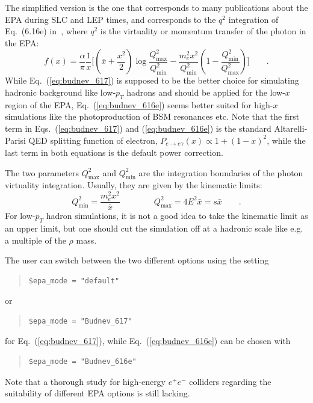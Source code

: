 \documentclass[12pt]{book}
\begin{document}
The simplified version is the one that corresponds to many
publications about the EPA during SLC and LEP times, and corresponds
to the $q^2$ integration of Eq.~(6.16e) in~\cite{Budnev:1974de}, where
$q^2$ is the virtuality or momentum transfer of the photon in the EPA:
\begin{equation}
  \label{eq:budnev_616e}
  f(x) = \frac{\alpha}{\pi} \frac{1}{x} \biggl[ \left( \bar{x} +
    \frac{x^2}{2} \right) \log
    \frac{Q^2_{\text{max}}}{Q^2_{\text{min}}}
    - \frac{m_e^2 x^2}{Q^2_{\text{min}}} \left( 1 -
    \frac{Q^2_{\text{min}}}{Q^2_{\text{max}}} \right) \biggr] \qquad .
\end{equation}
While Eq.~(\ref{eq:budnev_617}) is supposed to be the better choice
for simulating hadronic background like low-$p_T$ hadrons and should
be applied for the low-$x$ region of the EPA,
Eq.~(\ref{eq:budnev_616e}) seems better suited for high-$x$
simulations like the photoproduction of BSM resonances etc.
Note that the first term in Eqs.~(\ref{eq:budnev_617}) and
(\ref{eq:budnev_616e}) is the standard Altarelli-Parisi QED splitting
function of electron, $P_{e\to e\gamma}(x) \propto 1 + (1-x)^2$, while
the last term in both equations is the default power correction.

The two parameters $Q^2_{\text{max}}$ and $Q^2_{\text{min}}$ are the
integration boundaries of the photon virtuality integration. Usually,
they are given by the kinematic limits:
\begin{equation}
  Q^2_{\text{min}} = \frac{m_e^2 x^2}{\bar{x}} \qquad\qquad
  Q^2_{\text{max}} = 4 E^2 \bar{x} = s \bar{x} \qquad .
\end{equation}
For low-$p_T$ hadron simulations, it is not a good idea to take the
kinematic limit as an upper limit, but one should cut the simulation
off at a hadronic scale like e.g. a multiple of the $\rho$ mass.

The user can switch between the two different options using the setting
\begin{quote}
\begin{footnotesize}
\begin{Verbatim}
$epa_mode = "default"
\end{Verbatim}
\end{footnotesize}
\end{quote}
or
\begin{quote}
\begin{footnotesize}
\begin{Verbatim}
$epa_mode = "Budnev_617"
\end{Verbatim}
\end{footnotesize}
\end{quote}
for Eq.~(\ref{eq:budnev_617}), while Eq.~(\ref{eq:budnev_616e}) can be
chosen with
\begin{quote}
\begin{footnotesize}
\begin{Verbatim}
$epa_mode = "Budnev_616e"
\end{Verbatim}
\end{footnotesize}
\end{quote}
Note that a thorough study for high-energy $e^+e^-$ colliders
regarding the suitability of different EPA options is still lacking.
\end{document}
